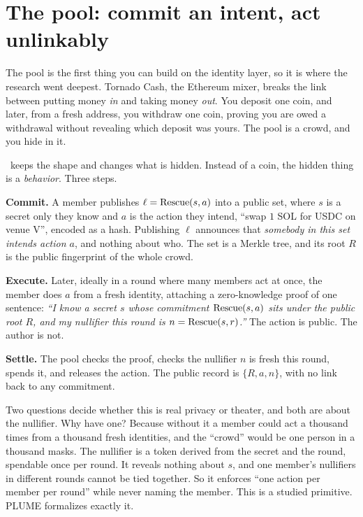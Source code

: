 \documentclass[11pt]{article}
\begin{document}
\section{The pool: commit an intent, act unlinkably}
\label{sec:pool}

The pool is the first thing you can build on the identity layer, so it is where the
research went deepest. Tornado Cash, the Ethereum mixer, breaks the link between putting
money \emph{in} and taking money \emph{out}. You deposit one coin, and later, from a
fresh address, you withdraw one coin, proving you are owed a withdrawal without
revealing which deposit was yours. The pool is a crowd, and you hide in it.

\river\ keeps the shape and changes what is hidden. Instead of a coin, the hidden thing
is a \emph{behavior}. Three steps.

\textbf{Commit.} A member publishes $\ell = \mathrm{Rescue}(s, a)$ into a public set, where $s$
is a secret only they know and $a$ is the action they intend, ``swap $1$ SOL for USDC on
venue V'', encoded as a hash. Publishing $\ell$ announces that \emph{somebody in this
set intends action $a$}, and nothing about who. The set is a Merkle tree, and its root
$R$ is the public fingerprint of the whole crowd.

\textbf{Execute.} Later, ideally in a round where many members act at once, the member
does $a$ from a fresh identity, attaching a zero-knowledge proof of one sentence:
\emph{``I know a secret $s$ whose commitment $\mathrm{Rescue}(s,a)$ sits under the public root
$R$, and my nullifier this round is $n = \mathrm{Rescue}(s, r)$.''} The action is public. The
author is not.

\textbf{Settle.} The pool checks the proof, checks the nullifier $n$ is fresh this
round, spends it, and releases the action. The public record is $\{R, a, n\}$, with no
link back to any commitment.

Two questions decide whether this is real privacy or theater, and both are about the
nullifier. Why have one? Because without it a member could act a thousand times from a
thousand fresh identities, and the ``crowd'' would be one person in a thousand masks.
The nullifier is a token derived from the secret and the round, spendable once per
round. It reveals nothing about $s$, and one member's nullifiers in different rounds
cannot be tied together. So it enforces ``one action per member per round'' while never
naming the member. This is a studied primitive. PLUME \cite{plume} formalizes exactly
it.
\end{document}
